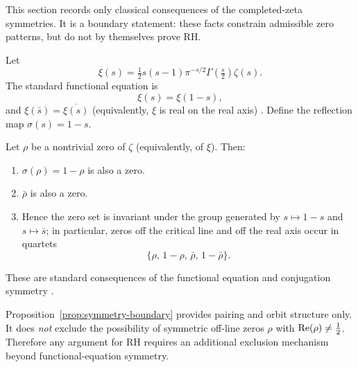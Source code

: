 This section records only classical consequences of the completed-zeta symmetries.
It is a boundary statement: these facts constrain admissible zero patterns, but do not by themselves prove RH.

Let
\[
\xi(s)=\tfrac12 s(s-1)\pi^{-s/2}\Gamma\!\left(\tfrac{s}{2}\right)\zeta(s).
\]
The standard functional equation is
\[
\xi(s)=\xi(1-s),
\]
and $\xi(\bar s)=\overline{\xi(s)}$ (equivalently, $\xi$ is real on the real axis) \cite{Edwards1974,Titchmarsh1986}.
Define the reflection map $\sigma(s)=1-s$.

\begin{proposition}
\label{prop:symmetry-boundary}
Let $\rho$ be a nontrivial zero of $\zeta$ (equivalently, of $\xi$). Then:
\begin{enumerate}
  \item $\sigma(\rho)=1-\rho$ is also a zero.
  \item $\bar\rho$ is also a zero.
  \item Hence the zero set is invariant under the group generated by $s\mapsto 1-s$ and $s\mapsto \bar s$; in particular, zeros off the critical line and off the real axis occur in quartets
  \[
  \{\rho,\,1-\rho,\,\bar\rho,\,1-\bar\rho\}.
  \]
\end{enumerate}
These are standard consequences of the functional equation and conjugation symmetry \cite{Edwards1974,Titchmarsh1986}.
\end{proposition}

\begin{remark}
Proposition~\ref{prop:symmetry-boundary} provides pairing and orbit structure only.
It does \emph{not} exclude the possibility of symmetric off-line zeros $\rho$ with $\operatorname{Re}(\rho)\neq \tfrac12$.
Therefore any argument for RH requires an additional exclusion mechanism beyond functional-equation symmetry.
\end{remark}


